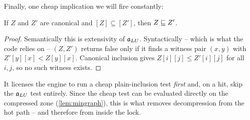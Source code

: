 Finally, one cheap implication we will fire constantly:

\begin{lemma}\label{lem:incl-implies-alu}
If $Z$ and $Z'$ are canonical and $[Z] \subseteq [Z']$, then $Z \sqsubseteq Z'$.
\end{lemma}

\begin{proof}
Semantically this is extensivity of $\mathfrak{a}_{LU}$.  Syntactically -- which is what the
code relies on -- $(Z,Z')$ returns false only if it finds
a witness pair $(x,y)$ with $Z'[y][x] < Z[y][x]$.  Canonical inclusion gives
$Z[i][j] \le Z'[i][j]$ for all $i,j$, so no such witness exists.
\end{proof}

\begin{remark}
It licenses the engine to run a cheap plain-inclusion test \emph{first} and, on
a hit, skip the $\mathfrak{a}_{LU}$ test entirely.  Since the cheap test can be evaluated
directly on the compressed zone (\cref{lem:mingraph}), this is what removes
decompression from the hot path -- and therefore from inside the lock.
\end{remark}
